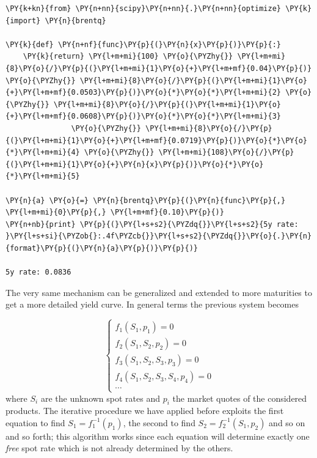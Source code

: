 \begin{codebox}
\begin{Verbatim}[commandchars=\\\{\}]
\PY{k+kn}{from} \PY{n+nn}{scipy}\PY{n+nn}{.}\PY{n+nn}{optimize} \PY{k}{import} \PY{n}{brentq}

\PY{k}{def} \PY{n+nf}{func}\PY{p}{(}\PY{n}{x}\PY{p}{)}\PY{p}{:}
    \PY{k}{return} \PY{l+m+mi}{100} \PY{o}{\PYZhy{}} \PY{l+m+mi}{8}\PY{o}{/}\PY{p}{(}\PY{l+m+mi}{1}\PY{o}{+}\PY{l+m+mf}{0.04}\PY{p}{)} \PY{o}{\PYZhy{}} \PY{l+m+mi}{8}\PY{o}{/}\PY{p}{(}\PY{l+m+mi}{1}\PY{o}{+}\PY{l+m+mf}{0.0503}\PY{p}{)}\PY{o}{*}\PY{o}{*}\PY{l+m+mi}{2} \PY{o}{\PYZhy{}} \PY{l+m+mi}{8}\PY{o}{/}\PY{p}{(}\PY{l+m+mi}{1}\PY{o}{+}\PY{l+m+mf}{0.0608}\PY{p}{)}\PY{o}{*}\PY{o}{*}\PY{l+m+mi}{3} 
               \PY{o}{\PYZhy{}} \PY{l+m+mi}{8}\PY{o}{/}\PY{p}{(}\PY{l+m+mi}{1}\PY{o}{+}\PY{l+m+mf}{0.0719}\PY{p}{)}\PY{o}{*}\PY{o}{*}\PY{l+m+mi}{4} \PY{o}{\PYZhy{}} \PY{l+m+mi}{108}\PY{o}{/}\PY{p}{(}\PY{l+m+mi}{1}\PY{o}{+}\PY{n}{x}\PY{p}{)}\PY{o}{*}\PY{o}{*}\PY{l+m+mi}{5}

\PY{n}{a} \PY{o}{=} \PY{n}{brentq}\PY{p}{(}\PY{n}{func}\PY{p}{,} \PY{l+m+mi}{0}\PY{p}{,} \PY{l+m+mf}{0.10}\PY{p}{)}
\PY{n+nb}{print} \PY{p}{(}\PY{l+s+s2}{\PYZdq{}}\PY{l+s+s2}{5y rate: }\PY{l+s+si}{\PYZob{}:.4f\PYZcb{}}\PY{l+s+s2}{\PYZdq{}}\PY{o}{.}\PY{n}{format}\PY{p}{(}\PY{n}{a}\PY{p}{)}\PY{p}{)}

5y rate: 0.0836
\end{Verbatim}
\end{codebox}

The very same mechanism can be generalized and extended to more maturities to get a more detailed yield curve. In general terms the previous system becomes

\begin{equation}
\begin{cases}
f_1(S_1, p_1) = 0 \\
f_2(S_1, S_2, p_2) = 0 \\
f_3(S_1, S_2, S_3, p_3) = 0 \\
f_4(S_1, S_2, S_3, S_4, p_4) = 0 \\
\cdots
\end{cases}
\end{equation}
where $S_i$ are the unknown spot rates and $p_i$ the market quotes of the considered products. The iterative procedure we have applied before exploits the first equation to find $S_1 = f_1^{-1}(p_1)$, the second to find $S_2 = f_2^{-1}(S_1, p_2)$ and so on and so forth; this algorithm works since each equation will determine exactly one \emph{free} spot rate which is not already determined by the others.

